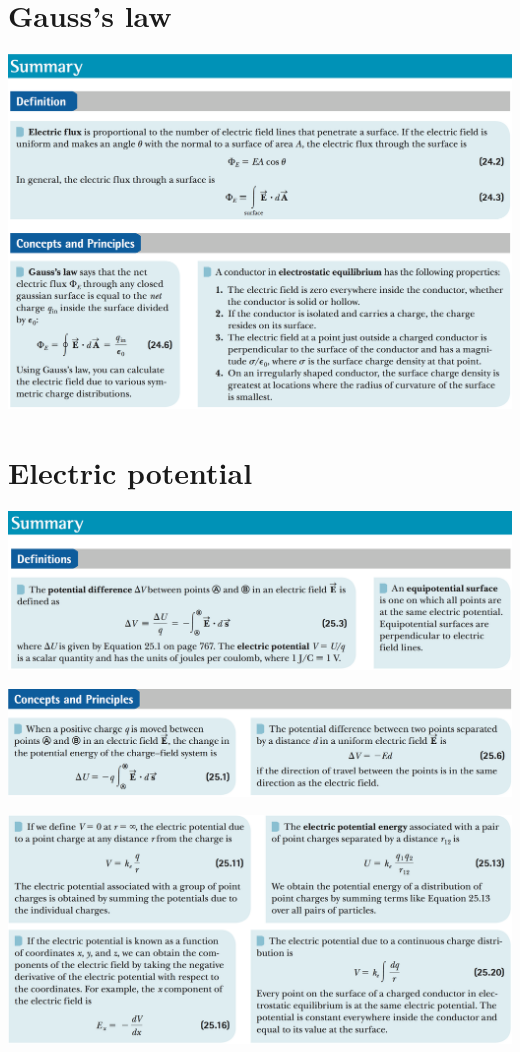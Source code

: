 \documentclass[12pt,a4paper]{article}
\newcommand{\N}{\noindent}
\begin{document}
	\section{Gauss's law}
		\N \includegraphics[scale=.42]{2.png}
		
	\section{Electric potential}
		\N \includegraphics[scale=.42]{3_a.png}
		
		\vspace{2mm}
		\N \includegraphics[scale=.42]{3_b.png}
		
		\vspace{2mm}
		\N \includegraphics[scale=.42]{3_c.png}
		
\end{document}
